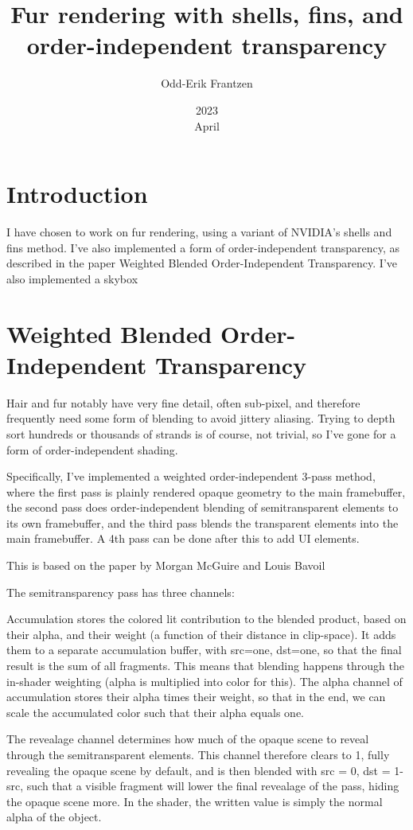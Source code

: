 \documentclass[a4paper, 12pt]{article}
\title{Fur rendering with shells, fins, and order-independent transparency}
\date{2023\\ April}
\author{Odd-Erik Frantzen}
\begin{document}
    \maketitle
    \section{Introduction}
    I have chosen to work on fur rendering,
    using a variant of NVIDIA's shells and fins method.
    I've also implemented a form of order-independent transparency,
    as described in the paper Weighted Blended Order-Independent Transparency.
    I've also implemented a skybox

    \section{Weighted Blended Order-Independent Transparency}

    Hair and fur notably have very fine detail, often sub-pixel,
    and therefore frequently need some form of blending to avoid jittery aliasing.
    Trying to depth sort hundreds or thousands of strands is of course, not trivial,
    so I've gone for a form of order-independent shading.

    Specifically, I've implemented a weighted order-independent 3-pass method,
    where the first pass is plainly rendered opaque geometry to the main framebuffer,
    the second pass does order-independent blending of semitransparent elements
    to its own framebuffer,
    and the third pass blends the transparent elements into the main framebuffer.
    A 4th pass can be done after this to add UI elements.

    This is based on the paper by Morgan McGuire and Louis Bavoil~\cite{McGuire2013Transparency}

    The semitransparency pass has three channels:

    Accumulation stores the colored lit contribution to the blended product,
    based on their alpha, and their weight (a function of their distance in clip-space).
    It adds them to a separate accumulation buffer, with src=one, dst=one,
    so that the final result is the sum of all fragments.
    This means that blending happens through the in-shader weighting (alpha is multiplied into color for this).
    The alpha channel of accumulation stores their alpha times their weight,
    so that in the end, we can scale the accumulated color such that their alpha equals one.

    The revealage channel determines how much of the opaque scene
    to reveal through the semitransparent elements.
    This channel therefore clears to 1, fully revealing the opaque scene by default,
    and is then blended with src = 0, dst = 1-src,
    such that a visible fragment
    will lower the final revealage of the pass,
    hiding the opaque scene more.
    In the shader, the written value is simply the normal alpha of the object.
\end{document}
